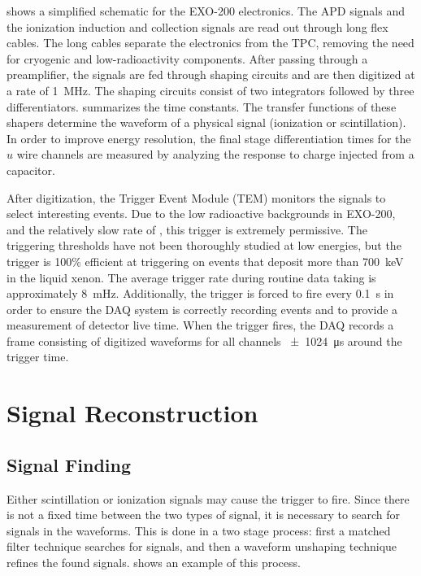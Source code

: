 \documentclass[herrin-thesis.tex]{subfiles}
\begin{document}
 shows a simplified schematic for the EXO-200 electronics. The APD signals and the ionization induction and collection signals are read out through long flex cables. The long cables separate the electronics from the TPC, removing the need for cryogenic and low-radioactivity components. After passing through a preamplifier, the signals are fed through shaping circuits and are then digitized at a rate of \SI{1}{\MHz}. The shaping circuits consist of two integrators followed by three differentiators.  summarizes the time constants.  The transfer functions of these shapers determine the waveform of a physical signal (ionization or scintillation). In order to improve energy resolution, the final stage differentiation times for the \(u\) wire channels are measured by analyzing the response to charge injected from a capacitor.

After digitization, the Trigger Event Module (TEM) monitors the signals to select interesting events. Due to the low radioactive backgrounds in EXO-200, and the relatively slow rate of \twonu, this trigger is extremely permissive. The triggering thresholds have not been thoroughly studied at low energies, but the trigger is 100\% efficient at triggering on events that deposit more than \SI{700}{\keV} in the liquid xenon. The average trigger rate during routine data taking is approximately \SI{8}{\mHz}. Additionally, the trigger is forced to fire every \SI{0.1}{\s} in order to ensure the DAQ system is correctly recording events and to provide a measurement of detector live time. When the trigger fires, the DAQ records a frame consisting of digitized waveforms for all channels \SI{\pm1024}{\micro\s} around the trigger time.

\section{Signal Reconstruction}
\label{sec:data_reconstruction}
\subsection{Signal Finding}
Either scintillation or ionization signals may cause the trigger to fire. Since there is not a fixed time between the two types of signal, it is necessary to search for signals in the waveforms. This is done in a two stage process: first a matched filter technique searches for signals, and then a waveform unshaping technique refines the found signals.  shows an example of this process.
\end{document}
